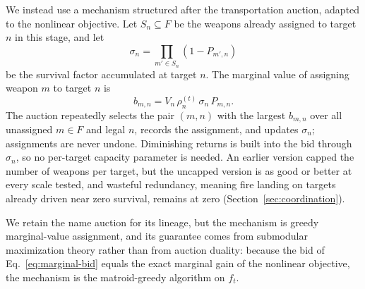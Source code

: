 We instead use a mechanism structured after the transportation auction, adapted to the nonlinear objective. Let $S_n \subseteq F$ be the weapons already assigned to target $n$ in this stage, and let
\begin{equation}
\label{eq:survival-factor}
\sigma_n = \prod_{m' \in S_n} (1 - P_{m',n})
\end{equation}
be the survival factor accumulated at target $n$. The marginal value of assigning weapon $m$ to target $n$ is
\begin{equation}
\label{eq:marginal-bid}
b_{m,n} = V_n\,\rho_n^{(t)}\,\sigma_n\,P_{m,n}.
\end{equation}
The auction repeatedly selects the pair $(m,n)$ with the largest $b_{m,n}$ over all unassigned $m \in F$ and legal $n$, records the assignment, and updates $\sigma_n$; assignments are never undone. Diminishing returns is built into the bid through $\sigma_n$, so no per-target capacity parameter is needed. An earlier version capped the number of weapons per target, but the uncapped version is as good or better at every scale tested, and wasteful redundancy, meaning fire landing on targets already driven near zero survival, remains at zero (Section~\ref{sec:coordination}).

We retain the name auction for its lineage, but the mechanism is greedy marginal-value assignment, and its guarantee comes from submodular maximization theory rather than from auction duality: because the bid of Eq.~\eqref{eq:marginal-bid} equals the exact marginal gain of the nonlinear objective, the mechanism is the matroid-greedy algorithm on $f_t$.

